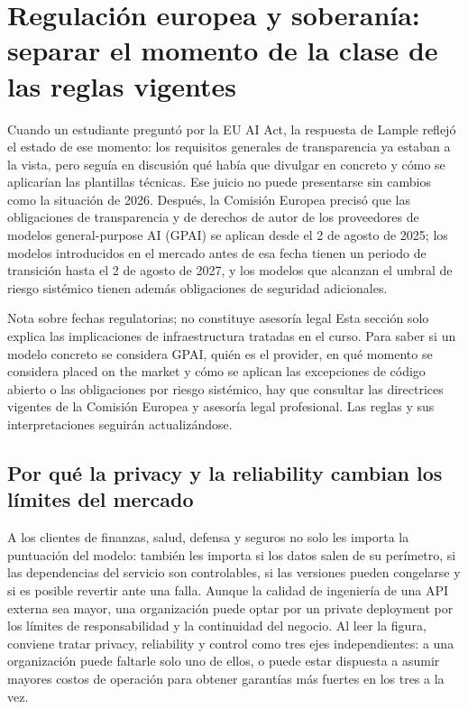 \documentclass[a4paper]{article}
\begin{document}
\section{Regulación europea y soberanía: separar el momento de la clase de las reglas vigentes}

Cuando un estudiante preguntó por la EU AI Act, la respuesta de Lample reflejó el estado de ese momento: los requisitos generales de transparencia ya estaban a la vista, pero seguía en discusión qué había que divulgar en concreto y cómo se aplicarían las plantillas técnicas. Ese juicio no puede presentarse sin cambios como la situación de 2026. Después, la Comisión Europea precisó que las obligaciones de transparencia y de derechos de autor de los proveedores de modelos general-purpose AI (GPAI) se aplican desde el 2 de agosto de 2025; los modelos introducidos en el mercado antes de esa fecha tienen un periodo de transición hasta el 2 de agosto de 2027, y los modelos que alcanzan el umbral de riesgo sistémico tienen además obligaciones de seguridad adicionales.

\begin{warningbox}{Nota sobre fechas regulatorias; no constituye asesoría legal}
Esta sección solo explica las implicaciones de infraestructura tratadas en el curso. Para saber si un modelo concreto se considera GPAI, quién es el provider, en qué momento se considera placed on the market y cómo se aplican las excepciones de código abierto o las obligaciones por riesgo sistémico, hay que consultar las directrices vigentes de la Comisión Europea y asesoría legal profesional. Las reglas y sus interpretaciones seguirán actualizándose.
\end{warningbox}

\subsection{Por qué la privacy y la reliability cambian los límites del mercado}

A los clientes de finanzas, salud, defensa y seguros no solo les importa la puntuación del modelo: también les importa si los datos salen de su perímetro, si las dependencias del servicio son controlables, si las versiones pueden congelarse y si es posible revertir ante una falla. Aunque la calidad de ingeniería de una API externa sea mayor, una organización puede optar por un private deployment por los límites de responsabilidad y la continuidad del negocio. Al leer la figura, conviene tratar privacy, reliability y control como tres ejes independientes: a una organización puede faltarle solo uno de ellos, o puede estar dispuesta a asumir mayores costos de operación para obtener garantías más fuertes en los tres a la vez.
\end{document}
